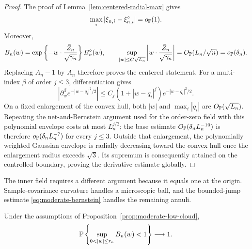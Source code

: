 \begin{proof}
The proof of Lemma~\ref{lem:centered-radial-max} gives
\[
 \max_i|\xi_{n,i}-\xi_{n,i}^{\circ}|=o_{\mathbb P}(1).
\]
Moreover,
\[
 B_n(w)
 =\exp\left\{-w\cdot\frac{\bar Z_n}{\sqrt{\gamma_n}}\right\}
   B_n^{\circ}(w),
 \qquad
 \sup_{|w|\le C\sqrt{L_n}}
 \left|w\cdot\frac{\bar Z_n}{\sqrt{\gamma_n}}\right|
 =O_{\mathbb P}(L_n/\sqrt n)=o_{\mathbb P}(\delta_n).
\]
Replacing \(A_n-1\) by \(A_n\) therefore proves the centered statement.
For a multi-index \(\beta\) of order \(j\le3\), differentiation gives
\[
  \left|\partial_w^\beta e^{-|w-q_i|^2/2}\right|
  \le C_j(1+|w-q_i|^j)e^{-|w-q_i|^2/2}.
\]
On a fixed enlargement of the convex hull, both \(|w|\) and
\(\max_i|q_i|\) are \(O_{\mathbb P}(\sqrt{L_n})\). Repeating the net-and-Bernstein
argument used for the order-zero field with this polynomial envelope costs at most
\(L_n^{j/2}\); the base estimate
\(O_{\mathbb P}(\delta_nL_n^{-10})\) is therefore
\(o_{\mathbb P}(\delta_nL_n^{-7})\) for every \(j\le3\). Outside that enlargement,
the polynomially weighted Gaussian envelope is radially decreasing toward the convex hull
once the enlargement radius exceeds \(\sqrt3\). Its supremum is consequently
attained on the controlled boundary, proving the derivative estimate globally.
\end{proof}

The inner field requires a different argument because it equals one at the
origin. Sample-covariance curvature handles a microscopic ball, and the
bounded-jump estimate \eqref{eq:moderate-bernstein} handles the remaining
annuli.

\begin{proposition}
\label{prop:moderate-inner-field}
Under the assumptions of Proposition~\ref{prop:moderate-low-cloud},
\begin{equation}
\label{eq:moderate-inner-field}
  \Pbb\left\{\sup_{0<|w|\le r_n}B_n(w)<1\right\}
  \longrightarrow1.
\end{equation}
\end{proposition}

